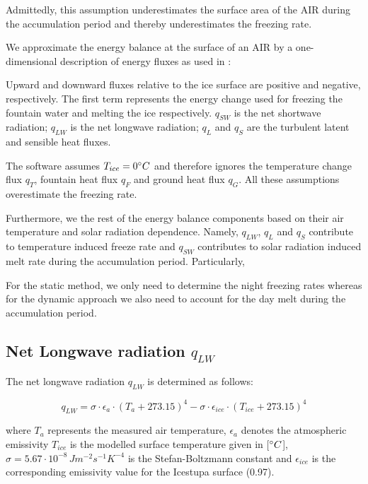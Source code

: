 \documentclass[utf8]{frontiersSCNS}
\begin{document}
Admittedly, this assumption underestimates the surface area of the AIR during the accumulation period and
thereby underestimates the freezing rate.

We approximate the energy balance at the surface of an AIR by a one-dimensional description of energy fluxes as
used in \cite{Balasubramanian_2022}:


Upward and downward fluxes relative to the ice surface are positive and negative, respectively. The first
term represents the energy change used for freezing the fountain water and melting the ice respectively.
$q_{SW}$ is the net shortwave radiation; $q_{LW}$ is the net longwave radiation; $q_{L}$ and $q_{S}$ are the
turbulent latent and sensible heat fluxes. 

The software assumes $T_{ice} = 0 \degree C$ and therefore ignores the temperature change flux $q_{T}$, fountain
heat flux $q_{F}$ and ground heat flux $q_{G}$. All these assumptions overestimate the freezing rate.

Furthermore, we the rest of the energy balance components based on their air temperature and solar
radiation dependence. Namely, $q_{LW}$, $q_{L}$ and $q_{S}$ contribute to temperature induced freeze rate and
$q_{SW}$ contributes to solar radiation induced melt rate during the accumulation period.  Particularly,

For the static method, we only need to determine the night freezing rates whereas for the dynamic approach we
also need to account for the day melt during the accumulation period.

\subsection{Net Longwave radiation \texorpdfstring{$q_{LW}$}{Lg}} \label{sec:LW}
The net longwave radiation $q_{LW}$ is determined as follows:

\begin{equation}
	q_{LW}= \sigma \cdot \epsilon_a \cdot {(T_a+ 273.15)}^4 -\sigma \cdot \epsilon_{ice} \cdot {(T_{ice}+ 273.15)}^4
	\label{eqn:LW}
\end{equation}

where $T_a$ represents the measured air temperature, $\epsilon_a$ denotes the atmospheric emissivity $T_{ice}$
is the modelled surface temperature given in [$\degree C$], $\sigma=5.67\cdot10^{-8}\,Jm^{-2}s^{-1}K^{-4}$ is
the Stefan-Boltzmann constant and $\epsilon_{ice}$ is the corresponding emissivity value for the Icestupa
surface (0.97).
\end{document}
